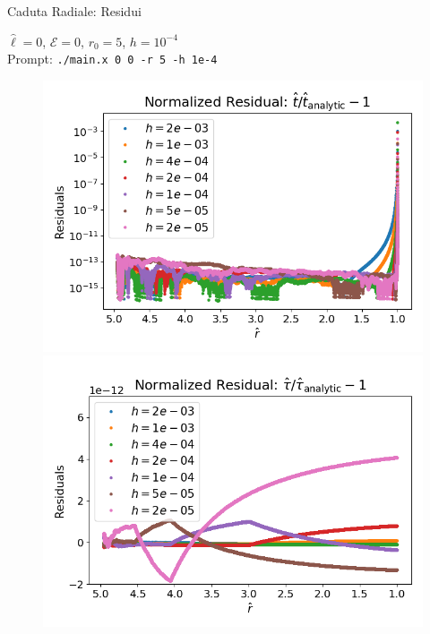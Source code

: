 \begin{frame}{Caduta Radiale: Residui}

    $\hat \ell = 0$, $\mathcal E = 0$, $r_0 = 5$, $h = 10^{-4}$ \\
    Prompt: \texttt{./main.x 0 0 -r 5 -h 1e-4}

    \begin{figure}[h]
        \begin{minipage}{0.48\textwidth}
            \centering
            \includegraphics[width=\textwidth]{Figures/ch2/t_res_multi.png}
        \end{minipage}
        \hspace{0.015 \textwidth}
        \begin{minipage}{0.48\textwidth}
            \centering
            \includegraphics[width=\textwidth]{Figures/ch2/tau_res_multi.png}
        \end{minipage}
    \end{figure}

\end{frame}


